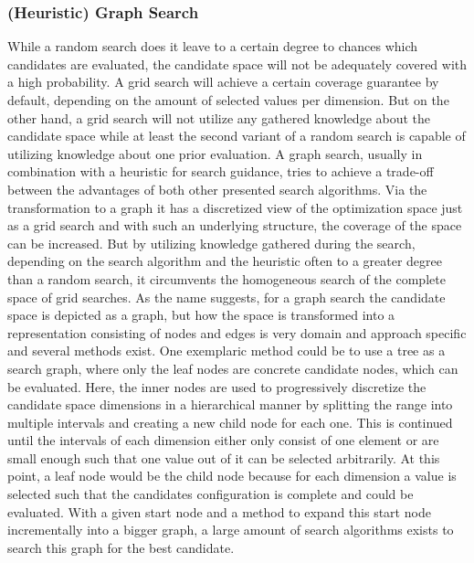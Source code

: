 \subsubsection{(Heuristic) Graph Search}
\label{sec:theory:optimization:graph}
While a random search does it leave to a certain degree to chances which candidates are evaluated, the candidate space will not be adequately covered with a high probability.
A grid search will achieve a certain coverage guarantee by default, depending on the amount of selected values per dimension.
But on the other hand, a grid search will not utilize any gathered knowledge about the candidate space while at least the second variant of a random search is capable of utilizing knowledge about one prior evaluation.\newline
A graph search, usually in combination with a heuristic for search guidance, tries to achieve a trade-off between the advantages of both other presented search algorithms.
Via the transformation to a graph it has a discretized view of the optimization space just as a grid search and with such an underlying structure, the coverage of the space can be increased.
But by utilizing knowledge gathered during the search, depending on the search algorithm and the heuristic often to a greater degree than a random search, it circumvents the homogeneous search of the complete space of grid searches.\newline
As the name suggests, for a graph search the candidate space is depicted as a graph, but how the space is transformed into a representation consisting of nodes and edges is very domain and approach specific and several methods exist.
One exemplaric method could be to use a tree as a search graph, where only the leaf nodes are concrete candidate nodes, which can be evaluated.
Here, the inner nodes are used to progressively discretize the candidate space dimensions in a hierarchical manner by splitting the range into multiple intervals and creating a new child node for each one.
This is continued until the intervals of each dimension either only consist of one element or are small enough such that one value out of it can be selected arbitrarily.
At this point, a leaf node would be the child node because for each dimension a value is selected such that the candidates configuration is complete and could be evaluated.\newline
With a given start node and a method to expand this start node incrementally into a bigger graph, a large amount of search algorithms exists to search this graph for the best candidate.
